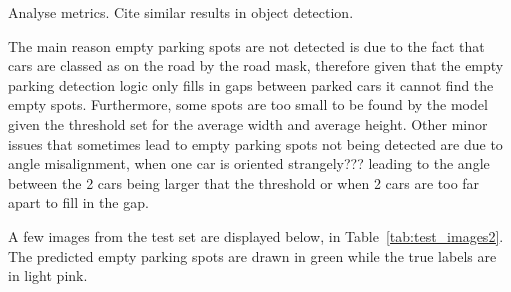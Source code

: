 Analyse metrics. Cite similar results in object detection.

The main reason empty parking spots are not detected is due to the fact that cars are classed as on the road by the road mask, therefore given that the empty parking detection logic only fills in gaps between parked cars it cannot find the empty spots.
Furthermore, some spots are too small to be found by the model given the threshold set for the average width and average height.
Other minor issues that sometimes lead to empty parking spots not being detected are due to angle misalignment, when one car is oriented strangely??? leading to the angle between the 2 cars being larger that the threshold or when 2 cars are too far apart to fill in the gap.

A few images from the test set are displayed below, in Table~\ref{tab:test_images2}.
The predicted empty parking spots are drawn in green while the true labels are in light pink.

